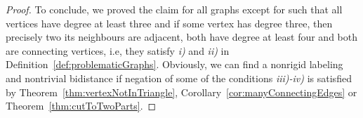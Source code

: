 \documentclass[a4paper, 11pt]{article}
\theoremstyle{definition}
\begin{document}
\begin{proof}
To conclude, we proved the claim for all graphs except for such that all vertices have degree at least three and if some vertex has degree three, then precisely two its neighbours are adjacent, both have degree at least four and both are connecting vertices, i.e, they satisfy \textit{i)} and \textit{ii)} in Definition~\ref{def:problematicGraphs}. Obviously, we can find a nonrigid labeling and nontrivial bidistance if negation of some of the conditions \textit{iii)-iv)} is satisfied by Theorem~\ref{thm:vertexNotInTriangle}, Corollary~\ref{cor:manyConnectingEdges} or Theorem~\ref{thm:cutToTwoParts}.
\end{proof}
\end{document}

